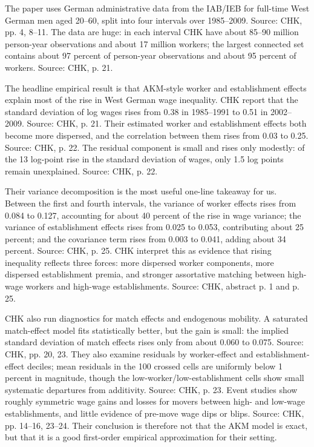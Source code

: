 \documentclass[11pt]{article}
\begin{document}
The paper uses German administrative data from the IAB/IEB for full-time West
German men aged 20--60, split into four intervals over 1985--2009. Source: CHK,
pp. 4, 8--11. The data are huge: in each interval CHK have about 85--90 million
person-year observations and about 17 million workers; the largest connected set
contains about 97 percent of person-year observations and about 95 percent of
workers. Source: CHK, p. 21.

The headline empirical result is that AKM-style worker and establishment effects
explain most of the rise in West German wage inequality. CHK report that the
standard deviation of log wages rises from 0.38 in 1985--1991 to 0.51 in
2002--2009. Source: CHK, p. 21. Their estimated worker and establishment effects
both become more dispersed, and the correlation between them rises from 0.03 to
0.25. Source: CHK, p. 22. The residual component is small and rises only modestly:
of the 13 log-point rise in the standard deviation of wages, only 1.5 log points
remain unexplained. Source: CHK, p. 22.

Their variance decomposition is the most useful one-line takeaway for us. Between
the first and fourth intervals, the variance of worker effects rises from 0.084 to
0.127, accounting for about 40 percent of the rise in wage variance; the variance of
establishment effects rises from 0.025 to 0.053, contributing about 25 percent; and
the covariance term rises from 0.003 to 0.041, adding about 34 percent. Source:
CHK, p. 25. CHK interpret this as evidence that rising inequality reflects three
forces: more dispersed worker components, more dispersed establishment premia,
and stronger assortative matching between high-wage workers and high-wage
establishments. Source: CHK, abstract p. 1 and p. 25.

CHK also run diagnostics for match effects and endogenous mobility. A saturated
match-effect model fits statistically better, but the gain is small: the implied
standard deviation of match effects rises only from about 0.060 to 0.075. Source:
CHK, pp. 20, 23. They also examine residuals by worker-effect and establishment-
effect deciles; mean residuals in the 100 crossed cells are uniformly below 1 percent
in magnitude, though the low-worker/low-establishment cells show small systematic
departures from additivity. Source: CHK, p. 23. Event studies show roughly
symmetric wage gains and losses for movers between high- and low-wage
establishments, and little evidence of pre-move wage dips or blips. Source: CHK,
pp. 14--16, 23--24. Their conclusion is therefore not that the AKM model is exact,
but that it is a good first-order empirical approximation for their setting.
\end{document}
